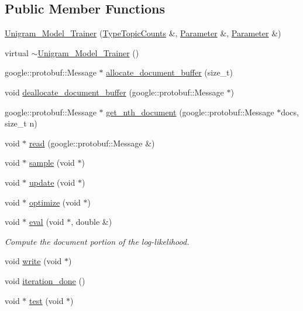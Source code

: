 \subsection*{Public Member Functions}
\begin{DoxyCompactItemize}
\item 
\hyperlink{class_unigram___model___trainer_a7cfa7c83a6ee199e53076e58c5a46a7e}{Unigram\_\-Model\_\-Trainer} (\hyperlink{class_type_topic_counts}{TypeTopicCounts} \&, \hyperlink{struct_parameter}{Parameter} \&, \hyperlink{struct_parameter}{Parameter} \&)
\item 
virtual \hyperlink{class_unigram___model___trainer_a4e72d620af52fdfa0a239e4bb8e97608}{$\sim$Unigram\_\-Model\_\-Trainer} ()
\item 
google::protobuf::Message $\ast$ \hyperlink{class_unigram___model___trainer_a92e5a9c1dcd4f1fdf4a2b158f6b31c7b}{allocate\_\-document\_\-buffer} (size\_\-t)
\item 
void \hyperlink{class_unigram___model___trainer_aa5f8c8441588c341c42ec6685bc313d7}{deallocate\_\-document\_\-buffer} (google::protobuf::Message $\ast$)
\item 
google::protobuf::Message $\ast$ \hyperlink{class_unigram___model___trainer_a032b2dcd9676b5a7ced2dcb57d509c84}{get\_\-nth\_\-document} (google::protobuf::Message $\ast$docs, size\_\-t n)
\item 
void $\ast$ \hyperlink{class_unigram___model___trainer_af4f1230edeb83227aaeee31e9f81aeeb}{read} (google::protobuf::Message \&)
\item 
void $\ast$ \hyperlink{class_unigram___model___trainer_a03d020dca2c75815773ba726c294e3d1}{sample} (void $\ast$)
\item 
void $\ast$ \hyperlink{class_unigram___model___trainer_af9031fc304f82bb2f9209c0913f36df6}{update} (void $\ast$)
\item 
void $\ast$ \hyperlink{class_unigram___model___trainer_afaf685a22d603c7a0b44ed692a928c13}{optimize} (void $\ast$)
\item 
void $\ast$ \hyperlink{class_unigram___model___trainer_a354f9cc690b803bc17284b6742702a66}{eval} (void $\ast$, double \&)
\begin{DoxyCompactList}\small\item\em Compute the document portion of the log-\/likelihood. \item\end{DoxyCompactList}\item 
void \hyperlink{class_unigram___model___trainer_aab907b06b666d441ec60c4703d2a8e4e}{write} (void $\ast$)
\item 
void \hyperlink{class_unigram___model___trainer_a8034a5fd2767a6869f87a82956e127d6}{iteration\_\-done} ()
\item 
void $\ast$ \hyperlink{class_unigram___model___trainer_a959873d7b22e159694473fdbcd470785}{test} (void $\ast$)
\end{DoxyCompactItemize}
